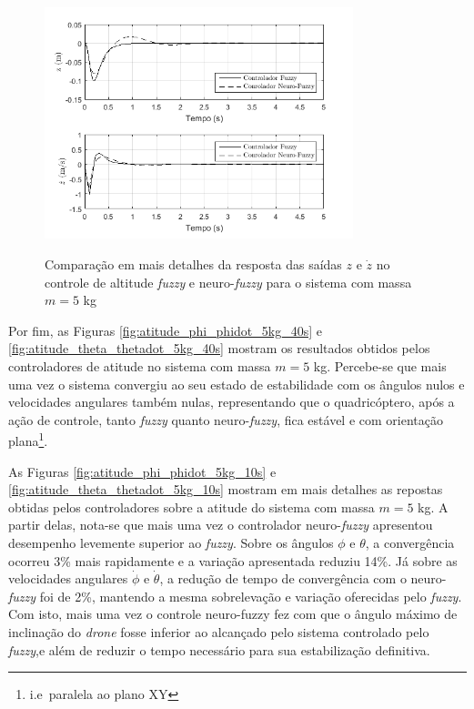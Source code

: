 \begin{figure}[!htb]
    \centering
    \caption{Comparação em mais detalhes da resposta das saídas $z$ e $\dot{z}$ no controle de altitude \textit{fuzzy} e neuro-\textit{fuzzy} para o sistema com massa $m=5$ kg}
    \includegraphics[width=0.8\textwidth]{./04-figuras/resultados/novos/altitude_z_zdot_5kg_closer}
    \label{fig:altitude_z_zdot_5kg_closer}
\end{figure}



Por fim, as Figuras \ref{fig:atitude_phi_phidot_5kg_40s} e \ref{fig:atitude_theta_thetadot_5kg_40s} mostram os resultados obtidos pelos controladores de atitude no sistema com massa $m=5$ kg. Percebe-se que mais uma vez o sistema convergiu ao seu estado de estabilidade com os ângulos nulos e velocidades angulares também nulas, representando que o quadricóptero, após a ação de controle, tanto \textit{fuzzy} quanto neuro-\textit{fuzzy}, fica estável e com orientação plana\footnote{i.e\ paralela ao plano XY}.

As Figuras \ref{fig:atitude_phi_phidot_5kg_10s} e \ref{fig:atitude_theta_thetadot_5kg_10s} mostram em mais detalhes as repostas obtidas pelos controladores sobre a atitude do sistema com massa $m=5$ kg. A partir delas, nota-se que mais uma vez o controlador neuro-\textit{fuzzy} apresentou desempenho levemente superior ao \textit{fuzzy}. Sobre os ângulos $\phi$ e $\theta$, a convergência ocorreu 3\% mais rapidamente e a variação apresentada reduziu 14\%. Já sobre as velocidades angulares $\dot{\phi}$ e $\dot{\theta}$, a redução de tempo de convergência com o neuro-\textit{fuzzy} foi de 2\%, mantendo a mesma sobrelevação e variação oferecidas pelo \textit{fuzzy}. Com isto, mais uma vez o controle neuro-fuzzy fez com que o ângulo máximo de inclinação do \textit{drone} fosse inferior ao alcançado pelo sistema controlado pelo \textit{fuzzy},e além de reduzir o tempo necessário para sua estabilização definitiva.

